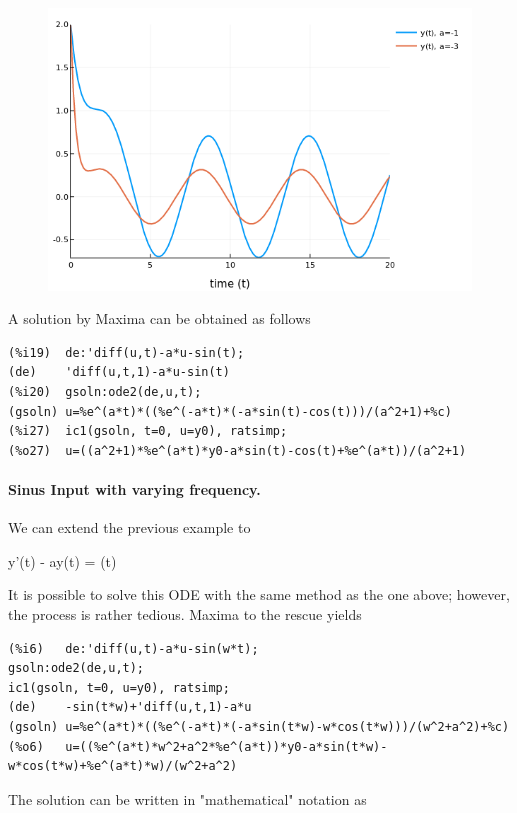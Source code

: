 \begin{figure}[H]
	\includegraphics[scale=0.5]{images/ode_02_04.png}
\end{figure}

A solution by Maxima can be obtained as follows

\begin{verbatim}
(%i19)	de:'diff(u,t)-a*u-sin(t);
(de)	'diff(u,t,1)-a*u-sin(t)
(%i20)	gsoln:ode2(de,u,t);
(gsoln)	u=%e^(a*t)*((%e^(-a*t)*(-a*sin(t)-cos(t)))/(a^2+1)+%c)
(%i27)	ic1(gsoln, t=0, u=y0), ratsimp;
(%o27)	u=((a^2+1)*%e^(a*t)*y0-a*sin(t)-cos(t)+%e^(a*t))/(a^2+1)
\end{verbatim}



\paragraph{Sinus Input with varying frequency.} We can extend the previous example to

\bee
y'(t) - ay(t) = \sin(\omega t)
\eee

It is possible to solve this ODE with the same method as the one above; however, the process is rather tedious. Maxima to the rescue yields

\begin{verbatim}
(%i6)	de:'diff(u,t)-a*u-sin(w*t);
gsoln:ode2(de,u,t);
ic1(gsoln, t=0, u=y0), ratsimp;
(de)	-sin(t*w)+'diff(u,t,1)-a*u
(gsoln)	u=%e^(a*t)*((%e^(-a*t)*(-a*sin(t*w)-w*cos(t*w)))/(w^2+a^2)+%c)
(%o6)	u=((%e^(a*t)*w^2+a^2*%e^(a*t))*y0-a*sin(t*w)-w*cos(t*w)+%e^(a*t)*w)/(w^2+a^2)
\end{verbatim}

The solution can be written in "mathematical" notation as

